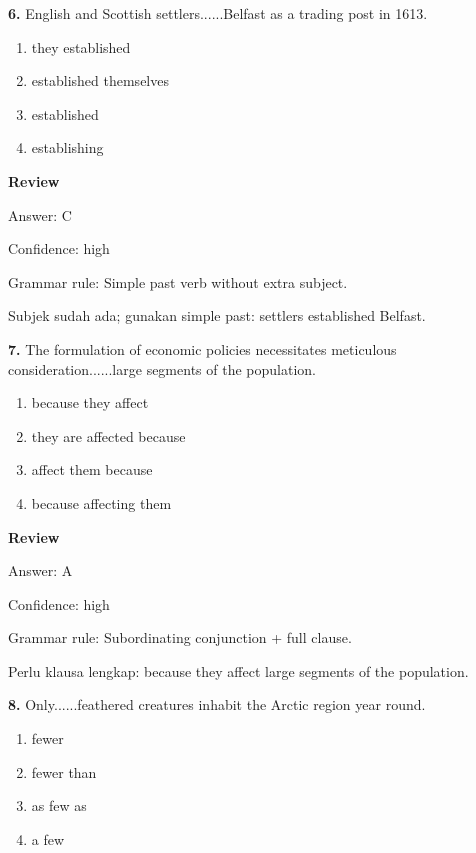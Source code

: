 \documentclass[12pt]{article}
\begin{document}
\endgroup
\par
\vspace{0.25\baselineskip}
\noindent\textbf{6.} English and Scottish settlers......Belfast as a trading post in 1613.
\begin{enumerate}[label=(\Alph*),leftmargin=*,itemsep=0.2em]
\item they established
\item established themselves
\item established
\item establishing
\end{enumerate}
\par
\begingroup
\setlength{\parskip}{0pt}
\setlength{\parindent}{0pt}
\textbf{Review}\par
Answer: C\par
Confidence: high\par
Grammar rule: Simple past verb without extra subject.\par
Subjek sudah ada; gunakan simple past: settlers established Belfast.\par
\endgroup
\par
\vspace{0.25\baselineskip}
\noindent\textbf{7.} The formulation of economic policies necessitates meticulous consideration......large segments of the population.
\begin{enumerate}[label=(\Alph*),leftmargin=*,itemsep=0.2em]
\item because they affect
\item they are affected because
\item affect them because
\item because affecting them
\end{enumerate}
\par
\begingroup
\setlength{\parskip}{0pt}
\setlength{\parindent}{0pt}
\textbf{Review}\par
Answer: A\par
Confidence: high\par
Grammar rule: Subordinating conjunction + full clause.\par
Perlu klausa lengkap: because they affect large segments of the population.\par
\endgroup
\par
\vspace{0.25\baselineskip}
\noindent\textbf{8.} Only......feathered creatures inhabit the Arctic region year round.
\begin{enumerate}[label=(\Alph*),leftmargin=*,itemsep=0.2em]
\item fewer
\item fewer than
\item as few as
\item a few
\end{enumerate}
\end{document}
